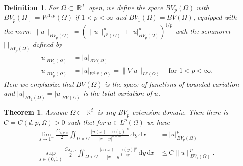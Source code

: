 \documentclass[10pt,a4paper]{amsart}
\newtheorem{theorem}{Theorem}
\newtheorem{definition}{Definition}
\DeclareMathOperator{\R}{\mathbb{R}}
\renewcommand{\d}{\,\mathrm{d}}
\begin{document}
\begin{definition}\label{def:bvp-space}
 For $\Omega\subset \R^d$ open,  we define  the space $BV_p(\Omega)$ with $BV_p(\Omega)= W^{1,p}(\Omega)$ if $1< p<\infty$ and $BV_1(\Omega)= BV(\Omega)$, equipped with the norm $\|u\|_{ BV_p(\Omega)} =(\|u\|^p_{L^p(\Omega)} +|u|^p_{BV_p(\Omega)})^{1/p}$ with the seminorm $|\cdot|_{BV_p(\Omega)}$ defined by
\begin{align*}
|u|_{BV_1(\Omega)} &= |u|_{BV(\Omega)} \\
 |u|_{BV_p(\Omega)} &= |u|_{W^{1,p}(\Omega)} = \|\nabla u\|_{L^p(\Omega)} \quad \text{for } 1 < p < \infty.
\end{align*}
Here  we emphasize that $BV(\Omega)$ is the space of functions of bounded variation and  $|u|_{BV_1(\Omega)}= |u|_{BV(\Omega)} $ is the total variation of $u$.
\end{definition}

\begin{theorem}\label{thm:xBBM-frac}
Assume  $\Omega\subset \R^d$ is any $BV_p$-extension domain. Then there is $C= C(d,p,\Omega)>0$ such that for $u\in L^p(\Omega)$ we have
\begin{align*}
\lim_{s\to 1^-}\frac{C_{d,p,s}}{2}\iint_{ \Omega \times \Omega}\frac{|u(x) - u(y)|^p}{|x-y|^{d+sp}} \d y \d x&= |u|^p_{BV_p(\Omega)}\\
\sup_{s\in (0,1)} \frac{\widetilde{C}_{d,p,s}}{2}\iint_{ \Omega \times \Omega}\frac{|u(x) - u(y)|^p}{|x-y|^{d+sp}} \d y \d x &\leq C \|u\|^p_{BV_p(\Omega)}.
\end{align*}
\end{theorem}
\end{document}
